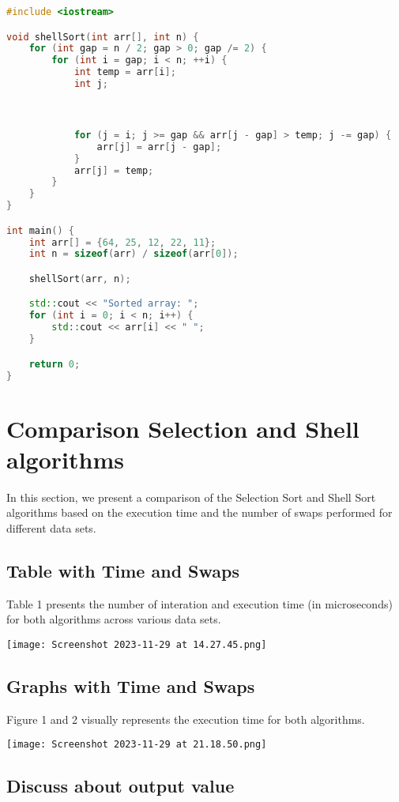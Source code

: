\documentclass{article}
\begin{document}
\begin{lstlisting}[language=C++, caption={Shell Sort in C++},label=shell-sort]
#include <iostream>

void shellSort(int arr[], int n) {
    for (int gap = n / 2; gap > 0; gap /= 2) {
        for (int i = gap; i < n; ++i) {
            int temp = arr[i];
            int j;



            for (j = i; j >= gap && arr[j - gap] > temp; j -= gap) {
                arr[j] = arr[j - gap];
            }
            arr[j] = temp;
        }
    }
}

int main() {
    int arr[] = {64, 25, 12, 22, 11};
    int n = sizeof(arr) / sizeof(arr[0]);

    shellSort(arr, n);

    std::cout << "Sorted array: ";
    for (int i = 0; i < n; i++) {
        std::cout << arr[i] << " ";
    }

    return 0;
}
\end{lstlisting}


\section{Comparison Selection and Shell algorithms}
In this section, we present a comparison of the Selection Sort and Shell Sort algorithms based on the execution time and the number of swaps performed for different data sets.
\subsection{Table with Time and Swaps}

Table 1 presents the number of interation and execution time (in microseconds) for both algorithms across various data sets.

\texttt{[image: Screenshot 2023-11-29 at 14.27.45.png]} 

\subsection{Graphs with Time and Swaps}
Figure 1 and 2 visually represents the execution time for both algorithms.

\texttt{[image: Screenshot 2023-11-29 at 21.18.50.png]} 

\subsection{Discuss about output value}
\end{document}
